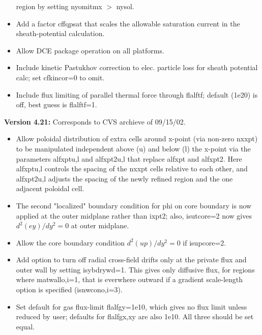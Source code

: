 \documentclass [12pt]{article}
\begin{document}
\begin{itemize}
          region by setting nyomitmx $>$ nysol.
  \item Add a factor cffqpsat that scales the allowable saturation
          current in the sheath-potential calculation.
  \item Allow DCE package operation on all platforms.
  \item Include kinetic Pastukhov correction to elec. particle loss
          for sheath potential calc; set cfkincor=0 to omit.
  \item Include flux limiting of parallel thermal force through
          flalftf; default (1e20) is off, best guess is flalftf=1.
\end{itemize}

\noindent\textbf{Version 4.21:} Corresponds to CVS archieve of 09/15/02.
\begin{itemize}
  \item Allow poloidal distribution of extra cells around x-point
          (via non-zero nxxpt) to be manipulated independent above (u)
          and below (l) the x-point via the parameters alfxptu,l and
          alfxpt2u,l that replace alfxpt and alfxpt2.  Here alfxptu,l
          controls the spacing of the nxxpt cells relative to each 
          other, and alfxpt2u,l adjusts the spacing of the newly
          refined region and the one adjacent poloidal cell.
  \item The second "localized" boundary condition for phi on core 
          boundary is now applied at the outer midplane rather than 
          ixpt2; also, isutcore=2 now gives $d^2(ey)/dy^2 = 0$ at outer
          midplane.
  \item Allow the core boundary condition $d^2(up)/dy^2=0$ if
          isupcore=2.
  \item Add option to turn off radial cross-field drifts only at the
          private flux and outer wall by setting isybdrywd=1.  This
          gives only diffusive flux, for regions where matwallo,i=1, 
          that is everwhere outward if a gradient scale-length option
          is specified (isnwcono,i=3).
  \item Set default for gas flux-limit flalfgy=1e10, which gives no
          flux limit unless reduced by user; defaults for flalfgx,xy
          are also 1e10.  All three should be set equal.
\end{itemize}
\end{document}
